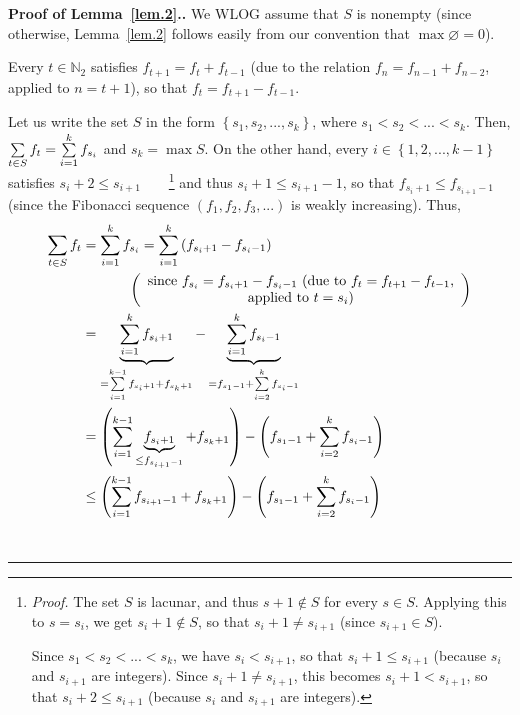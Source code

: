 \documentclass[numbers=enddot,12pt,final,onecolumn,notitlepage]{scrartcl}%
\numberwithin{exer}{section}
\theoremstyle{definition}
\newenvironment{proof}[1][Proof]{\noindent\textbf{#1.} }{\ \rule{0.5em}{0.5em}}
\let\sumnonlimits\sum
\renewcommand{\sum}{\sumnonlimits\limits}
\begin{document}
\begin{proof}[Proof of Lemma~\ref{lem.2}.] We WLOG assume that $S$ is nonempty (since
otherwise, Lemma~\ref{lem.2} follows easily from our convention that $\max\varnothing=
0$).

Every $t\in\mathbb{N}_{2}$ satisfies $f_{t+1}=f_{t}+f_{t-1}$ (due to the
relation $f_{n}=f_{n-1}+f_{n-2}$, applied to $n=t+1$), so that $f_{t}%
=f_{t+1}-f_{t-1}$.

Let us write the set $S$ in the form $\left\{  s_{1},s_{2},...,s_{k}\right\}
$, where $s_{1}<s_{2}<...<s_{k}$. Then, $\sum\limits_{t\in S}f_{t}%
=\sum\limits_{i=1}^{k}f_{s_{i}}$ and $s_{k}=\max S$. On the other hand, every
$i\in\left\{  1,2,...,k-1\right\}  $ satisfies $s_{i}+2\leq s_{i+1}%
$\ \ \ \ \footnote{\textit{Proof.} The set $S$ is lacunar, and thus $s+1\notin
S$ for every $s\in S$. Applying this to $s=s_{i}$, we get $s_{i}+1\notin S$,
so that $s_{i}+1\neq s_{i+1}$ (since $s_{i+1}\in S$).
\par
Since $s_{1}<s_{2}<...<s_{k}$, we have $s_{i}<s_{i+1}$, so that $s_{i}+1\leq
s_{i+1}$ (because $s_{i}$ and $s_{i+1}$ are integers). Since $s_{i}+1\neq
s_{i+1}$, this becomes $s_{i}+1<s_{i+1}$, so that $s_{i}+2\leq s_{i+1}$
(because $s_{i}$ and $s_{i+1}$ are integers).} and thus $s_{i}+1\leq
s_{i+1}-1$, so that $f_{s_{i}+1}\leq f_{s_{i+1}-1}$ (since the Fibonacci
sequence $\left(  f_{1},f_{2},f_{3},...\right)  $ is weakly increasing). Thus,%
\begin{align*}
\sum\limits_{t\in S}f_{t}  &  =\sum\limits_{i=1}^{k}f_{s_{i}}=\sum
\limits_{i=1}^{k}\left(  f_{s_{i}+1}-f_{s_{i}-1}\right) \\
&  \ \ \ \ \ \ \ \ \ \ \left(
\begin{array}
[c]{c}%
\text{since }f_{s_{i}}=f_{s_{i}+1}-f_{s_{i}-1}\text{ (due to }f_{t}%
=f_{t+1}-f_{t-1}\text{,}\\
\text{applied to }t=s_{i}\text{)}%
\end{array}
\right) \\
&  =\underbrace{\sum\limits_{i=1}^{k}f_{s_{i}+1}}_{=\sum\limits_{i=1}%
^{k-1}f_{s_{i}+1}+f_{s_{k}+1}}-\underbrace{\sum\limits_{i=1}^{k}f_{s_{i}-1}%
}_{=f_{s_{1}-1}+\sum\limits_{i=2}^{k}f_{s_{i}-1}}\\
&  =\left(  \sum\limits_{i=1}^{k-1}\underbrace{f_{s_{i}+1}}_{\leq
f_{s_{i+1}-1}}+f_{s_{k}+1}\right)  -\left(  f_{s_{1}-1}+\sum\limits_{i=2}%
^{k}f_{s_{i}-1}\right) \\
&  \leq\left(  \sum\limits_{i=1}^{k-1}f_{s_{i+1}-1}+f_{s_{k}+1}\right)
-\left(  f_{s_{1}-1}+\sum\limits_{i=2}^{k}f_{s_{i}-1}\right) \\

\end{align*}
\end{proof}
\end{document}
